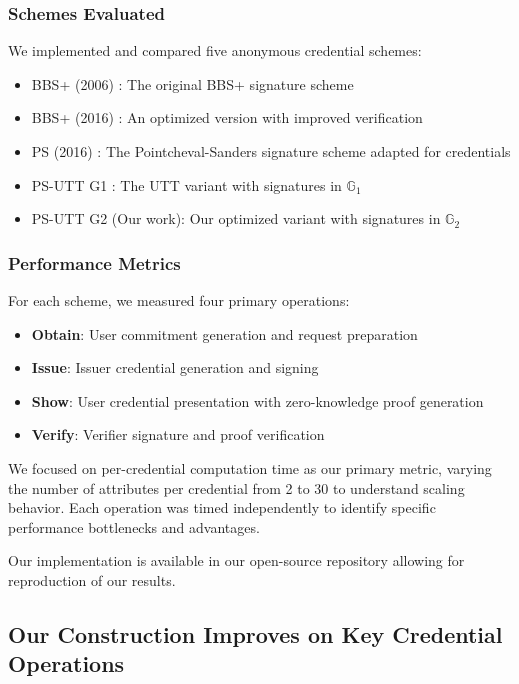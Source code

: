 \subsubsection{Schemes Evaluated}
We implemented and compared five anonymous credential schemes:
\begin{itemize}
    \item BBS+ (2006) \cite{hutchison_constant-size_2006}: The original BBS+ signature scheme
    \item BBS+ (2016) \cite{camenisch_anonymous_2016}: An optimized version with improved verification
    \item PS (2016) \cite{sako_short_2016}: The Pointcheval-Sanders signature scheme adapted for credentials
    \item PS-UTT G1 \cite{tomescu_utt_2022}: The UTT variant with signatures in $\mathbb{G}_1$
    \item PS-UTT G2 (Our work): Our optimized variant with signatures in $\mathbb{G}_2$
\end{itemize}

\subsubsection{Performance Metrics}
For each scheme, we measured four primary operations:
\begin{itemize}
    \item \textbf{Obtain}: User commitment generation and request preparation
    \item \textbf{Issue}: Issuer credential generation and signing
    \item \textbf{Show}: User credential presentation with zero-knowledge proof generation
    \item \textbf{Verify}: Verifier signature and proof verification
\end{itemize}

We focused on per-credential computation time as our primary metric, varying the number of attributes per credential from 2 to 30 to understand scaling behavior. Each operation was timed independently to identify specific performance bottlenecks and advantages.

Our implementation is available in our open-source repository \cite{polgar_anonymous_2025} allowing for reproduction of our results.




\subsection{Our Construction Improves on Key Credential Operations}

